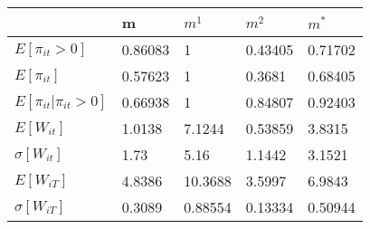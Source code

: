 \begin{tabular}{lllll}
& m & $m^1$ & $m^2$ & $m^*$ \\ 
\hline 
$E[\pi_{it}>0]$ & 0.86083 & 1 & 0.43405 & 0.71702 \\ 
$E[\pi_{it}]$ & 0.57623 & 1 & 0.3681 & 0.68405 \\ 
$E[\pi_{it}|\pi_{it}>0]$ & 0.66938 & 1 & 0.84807 & 0.92403 \\ 
$E[W_{it}]$ & 1.0138 & 7.1244 & 0.53859 & 3.8315 \\ 
$\sigma[W_{it}]$ & 1.73 & 5.16 & 1.1442 & 3.1521 \\ 
$E[W_{iT}]$ & 4.8386 & 10.3688 & 3.5997 & 6.9843 \\ 
$\sigma[W_{iT}]$ & 0.3089 & 0.88554 & 0.13334 & 0.50944 \\ 
\hline 
\end{tabular}